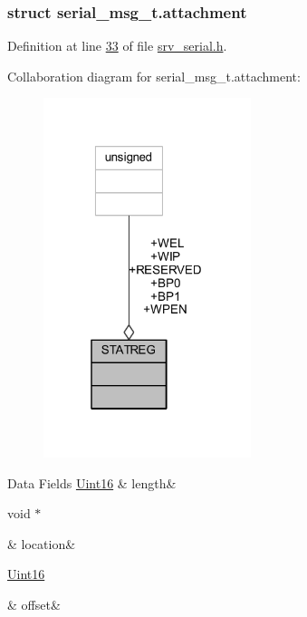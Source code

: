 \subsubsection{struct serial\+\_\+msg\+\_\+t.\+attachment}


Definition at line \hyperlink{a00031_source_l00033}{33} of file \hyperlink{a00031_source}{srv\+\_\+serial.\+h}.



Collaboration diagram for serial\+\_\+msg\+\_\+t.\+attachment\+:\nopagebreak
\begin{figure}[H]
\begin{center}
\leavevmode
\includegraphics[width=172pt]{dd/db4/a01693}
\end{center}
\end{figure}
\begin{DoxyFields}{Data Fields}
\hypertarget{a00031_a2fa47f7c65fec19cc163b195725e3844}{\hyperlink{a00072_a59a9f6be4562c327cbfb4f7e8e18f08b}{Uint16}}\label{a00031_a2fa47f7c65fec19cc163b195725e3844}
&
length&
\\
\hline

\hypertarget{a00031_ad5189de027922f81005951e6efe0efd5}{void $\ast$}\label{a00031_ad5189de027922f81005951e6efe0efd5}
&
location&
\\
\hline

\hypertarget{a00031_a7a86c157ee9713c34fbd7a1ee40f0c5a}{\hyperlink{a00072_a59a9f6be4562c327cbfb4f7e8e18f08b}{Uint16}}\label{a00031_a7a86c157ee9713c34fbd7a1ee40f0c5a}
&
offset&
\\
\hline

\end{DoxyFields}


